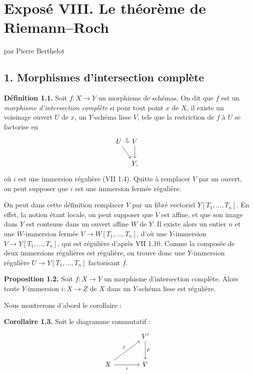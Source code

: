 \section*{Exposé VIII. Le théorème de Riemann--Roch}
\begin{center}
par Pierre Berthelot
\end{center}

\subsection*{1. Morphismes d'intersection complète}

\textbf{Définition 1.1.} Soit $f:X\to Y$ un morphisme de schémas. On dit que $f$ est un \emph{morphisme d'intersection complète} si pour tout point $x$ de $X$, il existe un voisinage ouvert $U$ de $x$, un $Y$-schéma lisse $V$, tels que la restriction de $f$ à $U$ se factorise en
\[
\begin{tikzcd}[column sep=tiny]
U \arrow[r,"i"] \arrow[dr] & V \arrow[d]\\
& Y,
\end{tikzcd}
\]
où $i$ est une immersion régulière (VII 1.4). Quitte à remplacer $V$ par un ouvert, on peut supposer que $i$ est une immersion fermée régulière.

On peut dans cette définition remplacer $V$ par un fibré vectoriel $Y[T_1,\ldots,T_n]$. En effet, la notion étant locale, on peut supposer que $V$ est affine, et que son image dans $Y$ est contenue dans un ouvert affine $W$ de $Y$. Il existe alors un entier $n$ et une $W$-immersion fermée $V\longrightarrow W[T_1,\ldots,T_n]$, d'où une $Y$-immersion $V\to Y[T_1,\ldots,T_n]$, qui est régulière d'après VII 1.10. Comme la composée de deux immersions régulières est régulière, on trouve donc une $Y$-immersion régulière $U\longrightarrow Y[T_1,\ldots,T_n]$ factorisant $f$.

\textbf{Proposition 1.2.} Soit $f:X\to Y$ un morphisme d'intersection complète. Alors toute $Y$-immersion $i:X\to Z$ de $X$ dans un $Y$-schéma lisse est régulière.

Nous montrerons d'abord le corollaire :

\textbf{Corollaire 1.3.} Soit le diagramme commutatif :
\[
\begin{tikzcd}[column sep=large,row sep=large]
& V' \arrow[d,"p"]\\
X \arrow[ur,"j"] \arrow[r,"i"'] & V
\end{tikzcd}
\]
